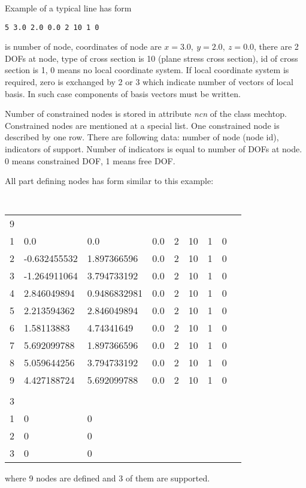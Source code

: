 Example of a typical line has form

\noindent
{\tt 5  3.0 2.0 0.0   2  10 1  0}

 is number of node, coordinates of node are $x=3.0,\ y=2.0,\ z=0.0$, there are 2 DOFs at node, type of
cross section is 10 (plane stress cross section), id of cross section is 1, 0 means no local coordinate
system. If local coordinate system is required, zero is exchanged by 2 or 3 which indicate number of vectors
of local basis. In such case components of basis vectors must be written.

Number of constrained nodes is stored in attribute {\it ncn} of the class {\sf mechtop}.
Constrained nodes are mentioned at a special list. One constrained node is described by one row.
There are following data: number of node (node id), indicators of support. Number of indicators
is equal to number of DOFs at node. 0 means constrained DOF, 1 means free DOF.

All part defining nodes has form similar to this example:

\begin{center}
{\tt
\begin{tabular}{lllllllll}
9 &              &              &     &   &    &   &
\\
1 & 0.0          & 0.0          & 0.0 & 2 & 10 & 1 & 0
\\
2 & -0.632455532 & 1.897366596  & 0.0 & 2 & 10 & 1 & 0
\\
3 &-1.264911064  & 3.794733192  & 0.0 & 2 & 10 & 1 & 0
\\
4 & 2.846049894  & 0.9486832981 & 0.0 & 2 & 10 & 1 & 0
\\
5 & 2.213594362  & 2.846049894  & 0.0 & 2 & 10 & 1 & 0
\\
6 & 1.58113883   & 4.74341649   & 0.0 & 2 & 10 & 1 & 0
\\
7 & 5.692099788  & 1.897366596  & 0.0 & 2 & 10 & 1 & 0
\\
8 & 5.059644256  & 3.794733192  & 0.0 & 2 & 10 & 1 & 0
\\
9 & 4.427188724  & 5.692099788  & 0.0 & 2 & 10 & 1 & 0
\\
\\
3 &              &              &     &   &    &   &
\\
1 & 0            & 0            &     &   &    &   &
\\
2 & 0            & 0            &     &   &    &   &
\\
3 & 0            & 0            &     &   &    &   &
\\
\end{tabular}
}
\end{center}

where 9 nodes are defined and 3 of them are supported.
